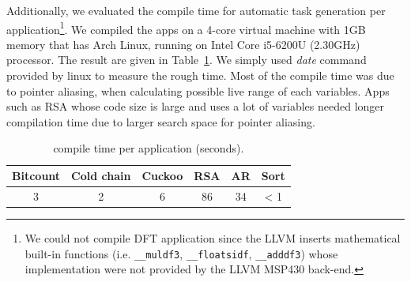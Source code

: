 Additionally, we evaluated the compile time for automatic task generation per application\footnote{We could not compile DFT application since the LLVM inserts mathematical built-in functions (i.e. \texttt{\_\_muldf3}, \texttt{\_\_floatsidf}, \texttt{\_\_adddf3}) whose implementation were not provided by the LLVM MSP430 back-end.}. We compiled the apps on a 4-core virtual machine with 1GB memory that has Arch Linux, running on Intel Core i5-6200U (2.30GHz) processor. The result are given in Table~\ref{table:compile_time}. We simply used {\em date} command provided by linux to measure the rough time. Most of the compile time was due to pointer aliasing, when calculating possible live range of each variables. Apps such as RSA whose code size is large and uses a lot of variables needed longer compilation time due to larger search space for pointer aliasing.

\begin{table}[t]
	\centering
	\footnotesize
	\begin{tabular}{|c|c|c|c|c|c|}
		\hline
		Bitcount & Cold chain & Cuckoo & RSA & AR & Sort \\
		\hline\hline
		3 & 2 & 6 & 86 & 34 & < 1 \\
		\hline
	\end{tabular}
	\caption{\sys compile time per application (seconds).}
\label{table:compile_time}
\end{table}



